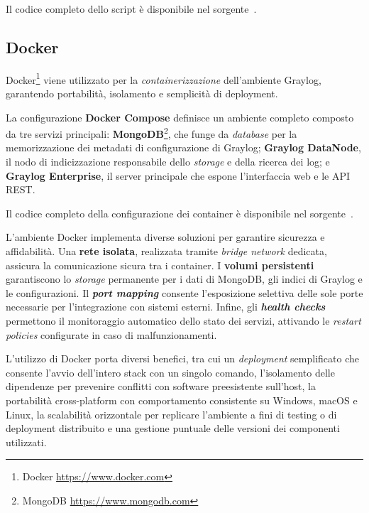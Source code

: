 \documentclass[12pt,twoside]{report}
\begin{document}
Il codice completo dello script è disponibile nel sorgente~.

\subsection{Docker}
\label{subsec:docker}

Docker\footnote{Docker \url{https://www.docker.com}} viene utilizzato per la \textit{containerizzazione} dell'ambiente Graylog, garantendo portabilità, isolamento e semplicità di deployment.

La configurazione \textbf{Docker Compose} definisce un ambiente completo composto da tre servizi principali: \textbf{MongoDB}\footnote{MongoDB \url{https://www.mongodb.com}}, che funge da \textit{database} per la memorizzazione dei metadati di configurazione di Graylog; \textbf{Graylog DataNode}, il nodo di indicizzazione responsabile dello \textit{storage} e della ricerca dei log; e \textbf{Graylog Enterprise}, il server principale che espone l'interfaccia web e le API REST.

Il codice completo della configurazione dei container è disponibile nel sorgente~.

L'ambiente Docker implementa diverse soluzioni per garantire sicurezza e affidabilità. Una \textbf{rete isolata}, realizzata tramite \textit{bridge network} dedicata, assicura la comunicazione sicura tra i container. I \textbf{volumi persistenti} garantiscono lo \textit{storage} permanente per i dati di MongoDB, gli indici di Graylog e le configurazioni. Il \textbf{\textit{port mapping}} consente l'esposizione selettiva delle sole porte necessarie per l'integrazione con sistemi esterni. Infine, gli \textbf{\textit{health checks}} permettono il monitoraggio automatico dello stato dei servizi, attivando le \textit{restart policies} configurate in caso di malfunzionamenti.

L'utilizzo di Docker porta diversi benefici, tra cui un \textit{deployment} semplificato che consente l'avvio dell'intero stack con un singolo comando, l'isolamento delle dipendenze per prevenire conflitti con software preesistente sull'host, la portabilità cross-platform con comportamento consistente su Windows, macOS e Linux, la scalabilità orizzontale per replicare l'ambiente a fini di testing o di deployment distribuito e una gestione puntuale delle versioni dei componenti utilizzati.


%
%
\end{document}
